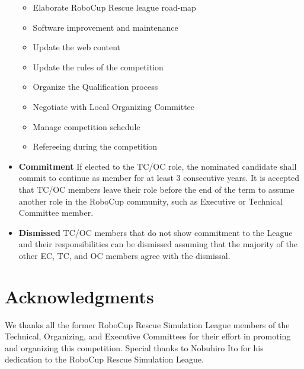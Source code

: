 \documentclass{article}
\begin{document}
\begin{itemize}
  \begin{itemize}
    \item Elaborate RoboCup Rescue league road-map
    \item Software improvement and maintenance
    \item Update the web content
    \item Update the rules of the competition
    \item Organize the Qualification process
    \item Negotiate with Local Organizing Committee
    \item Manage competition schedule
    \item Refereeing during the competition
  \end{itemize}
  \item \textbf{Commitment} If elected to the TC/OC role, the nominated candidate shall commit to continue as member for at least 3 consecutive years. It is accepted that TC/OC members leave their role before the end of the term to assume another role in the RoboCup community, such as Executive or Technical Committee member.
  \item \textbf{Dismissed} TC/OC members that do not show commitment to the League and their responsibilities can be dismissed assuming that the majority of the other EC, TC, and OC members agree with the dismissal.
\end{itemize}
\section*{Acknowledgments}
We thanks all the former RoboCup Rescue Simulation League members of the Technical, Organizing, and Executive Committees for their effort in promoting and organizing this competition. Special thanks to Nobuhiro Ito for his dedication to the RoboCup Rescue Simulation League.
\appendix
\end{document}
